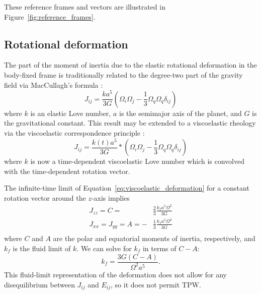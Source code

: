 \documentclass[extra,mreferee]{gji}
\begin{document}
These reference frames and vectors are illustrated in Figure~\ref{fig:reference_frames}.


\subsection{Rotational deformation}
\label{sec:rotational_deformation}

The part of the moment of inertia due to the elastic rotational deformation in the body-fixed frame 
is traditionally related to the degree-two part of the gravity field via MacCullagh's formula \citep{munk1960rotation}:
\begin{equation}
J_{ij} = \frac{k a^5}{3 G} \left( \Omega_i \Omega_j - \frac{1}{3} \Omega_q \Omega_q \delta_{ij} \right)
\label{eq:elastic_deformation}
\end{equation}
where $k$ is an elastic Love number, $a$ is the semimajor axis of the planet, and $G$ is the gravitational constant.
This result may be extended to a viscoelastic rheology via the viscoelastic correspondence principle \citep[e.g.][]{peltier1974impulse}:
\begin{equation}
J_{ij} = \frac{k(t) a^5}{3 G} * \left( \Omega_i \Omega_j - \frac{1}{3} \Omega_q \Omega_q \delta_{ij} \right)
\label{eq:viscoelastic_deformation}
\end{equation}
where $k$ is now a time-dependent viscoelastic Love number which is convolved with the time-dependent rotation vector.

The infinite-time limit of Equation~\eqref{eq:viscoelastic_deformation} for a 
constant rotation vector around the $z$-axis implies
\begin{equation}
\begin{aligned}
J_{zz} = C = &\frac{2}{3} \frac{k_f a^5 \Omega^2}{3 G} \\
J_{xx} = J_{yy} = A = -&\frac{1}{3} \frac{k_f a^5 \Omega^2}{3 G} \\
\end{aligned}
\end{equation}
where $C$ and $A$ are the polar and equatorial moments of inertia, respectively, 
and $k_f$ is the fluid limit of $k$. 
We can solve for $k_f$ in terms of $C-A$:
\begin{equation}
k_f = \frac{3 G (C-A)}{\Omega^2 a^5}.
\label{eq:fluid_love}
\end{equation}
This fluid-limit representation of the deformation does not allow for any disequilibrium between $J_{ij}$ and $E_{ij}$,
so it does not permit TPW.
\end{document}
